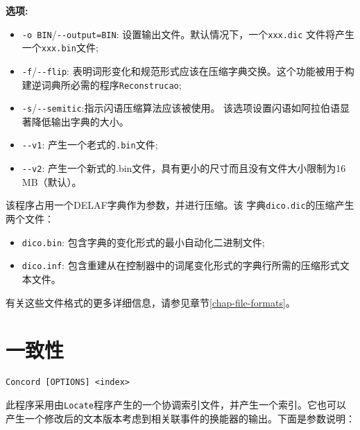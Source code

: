 \bigskip
\noindent \textbf{选项:}
\begin{itemize}
\item \verb+-o BIN+/\verb+--output=BIN+: 设置输出文件。默认情况下，一个\verb+xxx.dic+ 文件将产生一个\verb+xxx.bin+文件;
\item \verb+-f+/\verb+--flip+: 表明词形变化和规范形式应该在压缩字典交换。这个功能被用于构建逆词典所必需的程序\verb+Reconstrucao+;
\item \verb+-s+/\verb+--semitic+:指示闪语压缩算法应该被使用。
该选项设置闪语如阿拉伯语显著降低输出字典的大小。
\item \verb+--v1+: 产生一个老式的\verb+.bin+文件;
\item \verb+--v2+: 产生一个新式的.bin文件，具有更小的尺寸而且没有文件大小限制为16 MB（默认）。
\end{itemize}

\bigskip
\noindent 该程序占用一个DELAF字典作为参数，并进行压缩。该
字典\verb+dico.dic+的压缩产生两个文件：


\begin{itemize}
  \item \verb+dico.bin+: 包含字典的变化形式的最小自动化二进制文件;
  \item \verb+dico.inf+: 包含重建从在控制器中的词尾变化形式的字典行所需的压缩形式文本文件。
\end{itemize}

\bigskip
\noindent 有关这些文件格式的更多详细信息，请参见章节\ref{chap-file-formats}。






\section{一致性}
\label{section-Concord}
\verb+Concord [OPTIONS] <index>+

\bigskip
\noindent 此程序采用由\verb+Locate+程序产生的一个协调索引文件，并产生一个索引。它也可以产生一个修改后的文本版本考虑到相关联事件的换能器的输出。下面是参数说明： 


